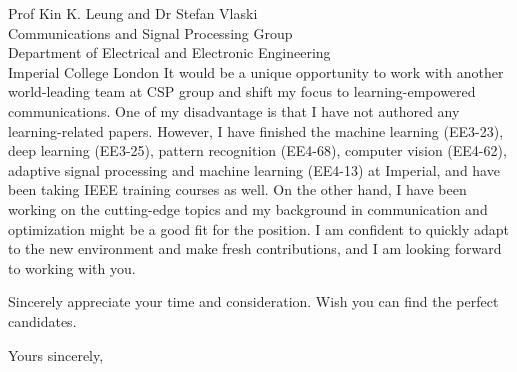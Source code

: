 \documentclass[10pt]{scrartcl}
\begin{document}
\begin{letter}{%
		Prof Kin K. Leung and Dr Stefan Vlaski\\
		Communications and Signal Processing Group\\
		Department of Electrical and Electronic Engineering\\
		Imperial College London
	}
	It would be a unique opportunity to work with another world-leading team at CSP group and shift my focus to learning-empowered communications.
	One of my disadvantage is that I have not authored any learning-related papers.
	However, I have finished the machine learning (EE3-23), deep learning (EE3-25), pattern recognition (EE4-68), computer vision (EE4-62), adaptive signal processing and machine learning (EE4-13) at Imperial, and have been taking IEEE training courses as well.
	On the other hand, I have been working on the cutting-edge topics and my background in communication and optimization might be a good fit for the position.
	I am confident to quickly adapt to the new environment and make fresh contributions, and I am looking forward to working with you.

	Sincerely appreciate your time and consideration. Wish you can find the perfect candidates.
	\closing{Yours sincerely,}
\end{letter}
\end{document}
